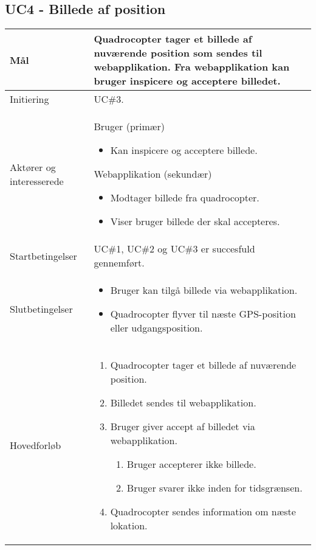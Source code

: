 \subsection*{UC4 - Billede af position}

\begin{table}[H]
\begin{tabular}{| p{3cm}| p{11.5cm}|}
\hline

Mål	 							& Quadrocopter tager et billede af nuværende position som sendes til webapplikation. Fra webapplikation kan bruger inspicere og acceptere billedet. \\\hline
Initiering 							& UC\#3. \\\hline
Aktører og interesserede			& Bruger (primær) 
										\begin{itemize}
											\item Kan inspicere og acceptere billede.
										\end{itemize} 
									  Webapplikation (sekundær)
										\begin{itemize}
											\item Modtager billede fra quadrocopter.
											\item Viser bruger billede der skal accepteres.
										\end{itemize} \\\hline
Startbetingelser							& UC\#1, UC\#2 og UC\#3 er succesfuld gennemført. \\\hline
Slutbetingelser						& 	\begin{itemize}
											\item Bruger kan tilgå billede via webapplikation.
											\item Quadrocopter flyver til næste GPS-position eller udgangsposition.
										\end{itemize} \\\hline
Hovedforløb				&
 
									\renewcommand{\labelenumi}{\arabic{enumi}.}
									\renewcommand{\labelenumii}{\Roman{enumii}:}

									\begin{enumerate}[topsep=0.0cm, leftmargin=0.5cm]
										\item Quadrocopter tager et billede af nuværende position.
										\item Billedet sendes til webapplikation.
										\item Bruger giver accept af billedet via webapplikation.
											\begin{enumerate}[partopsep=4cm, topsep=0cm, leftmargin=1cm]
												\item Bruger accepterer ikke billede.
												\item Bruger svarer ikke inden for tidsgrænsen.
											\end{enumerate}
										\item Quadrocopter sendes information om næste lokation.
									\end{enumerate} \\\hline	


\end{tabular}
\end{table}
